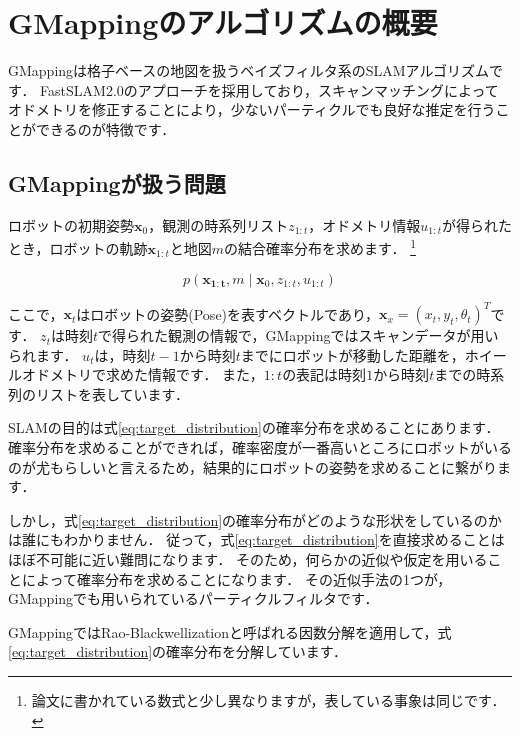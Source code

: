 \documentclass[{../../master}]{subfiles}
\begin{document}
\section{GMappingのアルゴリズムの概要}
\label{sec:gmapping_algorithm}

GMappingは格子ベースの地図を扱うベイズフィルタ系のSLAMアルゴリズムです．
FastSLAM2.0のアプローチを採用しており，スキャンマッチングによってオドメトリを修正することにより，少ないパーティクルでも良好な推定を行うことができるのが特徴です．

\subsection{GMappingが扱う問題}

ロボットの初期姿勢$\bm{x}_{0}$，観測の時系列リスト$z_{1:t}$，オドメトリ情報$u_{1:t}$が得られたとき，ロボットの軌跡$\bm{x}_{1:t}$と地図$m$の結合確率分布を求めます．
\footnote{論文\cite{Gmapping}に書かれている数式と少し異なりますが，表している事象は同じです．}

\begin{equation}
  p(\bm{x_{1:t}}, m \mid \bm{x}_{0}, z_{1:t}, u_{1:t})
  \label{eq:target_distribution}
\end{equation}

ここで，$\bm{x}_{t}$はロボットの姿勢(Pose)を表すベクトルであり，$\bm{x}_{x} = (x_{t}, y_{t}, \theta_{t})^T$です．
$z_{t}$は時刻$t$で得られた観測の情報で，GMappingではスキャンデータが用いられます．
$u_{t}$は，時刻$t-1$から時刻$t$までにロボットが移動した距離を，ホイールオドメトリで求めた情報です．
また，$1:t$の表記は時刻$1$から時刻$t$までの時系列のリストを表しています．

SLAMの目的は式\ref{eq:target_distribution}の確率分布を求めることにあります．
確率分布を求めることができれば，確率密度が一番高いところにロボットがいるのが尤もらしいと言えるため，結果的にロボットの姿勢を求めることに繋がります．

しかし，式\ref{eq:target_distribution}の確率分布がどのような形状をしているのかは誰にもわかりません．
従って，式\ref{eq:target_distribution}を直接求めることはほぼ不可能に近い難問になります．
そのため，何らかの近似や仮定を用いることによって確率分布を求めることになります．
その近似手法の1つが，GMappingでも用いられているパーティクルフィルタです．


GMappingではRao-Blackwellizationと呼ばれる因数分解を適用して，式\ref{eq:target_distribution}の確率分布を分解しています．
\end{document}

